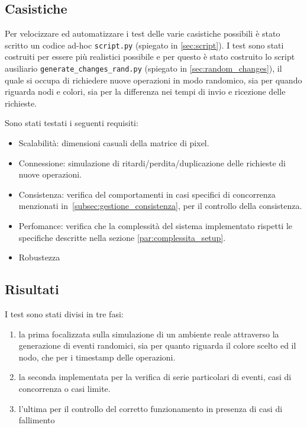 \documentclass[12pt, a4paper]{report}
\begin{document}
\subsection{Casistiche}

Per velocizzare ed automatizzare i test delle varie casistiche possibili \`e stato scritto un codice ad-hoc \texttt{script.py} (spiegato in \ref{sec:script}). I test sono stati costruiti per essere pi\`u realistici possibile e per questo \`e stato costruito lo script ausiliario \texttt{generate\_changes\_rand.py} (spiegato in \ref{sec:random_changes}), il quale si occupa di richiedere nuove operazioni in modo randomico, sia per quando riguarda nodi e colori, sia per la differenza nei tempi di invio e ricezione delle richieste.

\newpage
Sono stati testati i seguenti requisiti:
\begin{itemize}
    \item Scalabilit\`a: dimensioni casuali della matrice di pixel.
    \item Connessione: simulazione di ritardi/perdita/duplicazione delle richieste di nuove operazioni.
    \item Consistenza: verifica del comportamenti in casi specifici di concorrenza menzionati in~\ref{subsec:gestione_consistenza}, per il controllo della consistenza.
    \item Perfomance: verifica che la complessit\`a del sistema implementato rispetti le specifiche descritte nella sezione \ref{par:complessita_setup}.
    \item Robustezza
\end{itemize}

\subsection{Risultati}

I test sono stati divisi in tre fasi:
\begin{enumerate}
    \item la prima focalizzata sulla simulazione di un ambiente reale attraverso la generazione di eventi randomici, sia per quanto riguarda il colore scelto ed il nodo, che per i timestamp delle operazioni.
    \item la seconda implementata per la verifica di serie particolari di eventi, casi di concorrenza o casi limite.
    \item l'ultima per il controllo del corretto funzionamento in presenza di casi di fallimento
\end{enumerate} 
\end{document}
